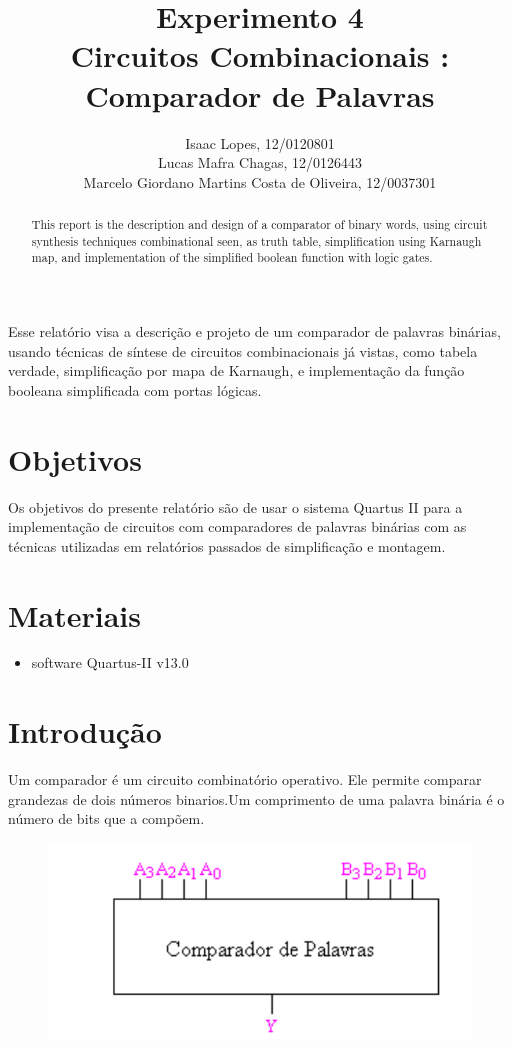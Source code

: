 \documentclass[12pt]{article}
\title{Experimento 4\\
	Circuitos Combinacionais : Comparador de Palavras }
\author{Isaac Lopes, 12/0120801\\
	Lucas Mafra Chagas, 12/0126443 \\
	Marcelo Giordano Martins Costa de Oliveira,  12/0037301
}
\begin{document}
 

\maketitle

 \begin{abstract}
   This report is the description and design of a comparator of binary words, using circuit synthesis techniques combinational seen, as truth table, simplification using Karnaugh map, and implementation of the simplified boolean function with logic gates. 
 \end{abstract}
     
 \begin{resumo} 
  Esse relatório visa a descrição e projeto de um comparador de palavras binárias, usando técnicas de síntese de circuitos combinacionais já vistas, como tabela verdade, simplificação por mapa de Karnaugh, e implementação da função booleana simplificada com portas lógicas. 
 \end{resumo}


\section{Objetivos}
\label{sec:Objetivos}

Os objetivos do presente relatório são de usar o sistema Quartus II para a implementação de circuitos com comparadores de palavras binárias com as técnicas utilizadas em relatórios passados de simplificação e montagem.

\section{Materiais} 
\label{sec:Materiais}

\begin{itemize}
    \item software Quartus-II v13.0
\end{itemize}
\section{Introdução}
\label{sec:Introducao}

Um comparador é um circuito combinatório operativo. Ele permite comparar grandezas de dois números binarios.Um comprimento de uma palavra binária é o número de bits que a compõem.
\begin{figure}[H]
	\centering
	\includegraphics[width=.5\textwidth]{cc1.png}	
\end{figure}
\end{document}
